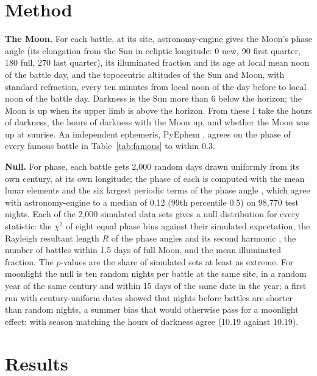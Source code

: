 \documentclass[11pt,a4paper]{article}
\begin{document}
\section{Method}
\textbf{The Moon.} For each battle, at its site, astronomy-engine \citep{astronomyengine} gives the Moon's phase angle (its elongation from the Sun in ecliptic longitude: 0\textdegree{} new, 90\textdegree{} first quarter, 180\textdegree{} full, 270\textdegree{} last quarter), its illuminated fraction and its age at local mean noon of the battle day, and the topocentric altitudes of the Sun and Moon, with standard refraction, every ten minutes from local noon of the day before to local noon of the battle day. Darkness is the Sun more than 6\textdegree{} below the horizon; the Moon is up when its upper limb is above the horizon. From these I take the hours of darkness, the hours of darkness with the Moon up, and whether the Moon was up at sunrise. An independent ephemeris, PyEphem \citep{pyephem}, agrees on the phase of every famous battle in Table~\ref{tab:famous} to within 0.3\textdegree.

\textbf{Null.} For phase, each battle gets 2,000 random days drawn uniformly from its own century, at its own longitude; the phase of each is computed with the mean lunar elements and the six largest periodic terms of the phase angle \citep{meeus}, which agree with astronomy-engine to a median of 0.12\textdegree{} (99th percentile 0.5\textdegree) on 98,770 test nights. Each of the 2,000 simulated data sets gives a null distribution for every statistic: the $\chi^2$ of eight equal phase bins against their simulated expectation, the Rayleigh resultant length $R$ of the phase angles and its second harmonic \citep{fisher1993}, the number of battles within 1.5 days of full Moon, and the mean illuminated fraction. The $p$-values are the share of simulated sets at least as extreme. For moonlight the null is ten random nights per battle at the same site, in a random year of the same century and within 15 days of the same date in the year; a first run with century-uniform dates showed that nights before battles are shorter than random nights, a summer bias that would otherwise pass for a moonlight effect; with season matching the hours of darkness agree (10.19 against 10.19).

\section{Results}
\end{document}
